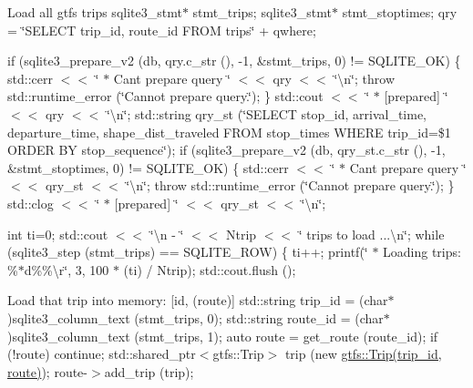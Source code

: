 Load all gtfs {\ttfamily trips} sqlite3\+\_\+stmt$\ast$ stmt\+\_\+trips; sqlite3\+\_\+stmt$\ast$ stmt\+\_\+stoptimes; qry = \char`\"{}\+S\+E\+L\+E\+C\+T trip\+\_\+id, route\+\_\+id F\+R\+O\+M trips\char`\"{} + qwhere;

if (sqlite3\+\_\+prepare\+\_\+v2 (db, qry.\+c\+\_\+str (), -\/1, \&stmt\+\_\+trips, 0) != S\+Q\+L\+I\+T\+E\+\_\+\+OK) \{ std\+::cerr $<$$<$ \char`\"{} $\ast$ Can\textquotesingle{}t prepare query \char`\"{} $<$$<$ qry $<$$<$ \char`\"{}\textbackslash{}n\char`\"{}; throw std\+::runtime\+\_\+error (\char`\"{}\+Cannot prepare query.\char`\"{}); \} std\+::cout $<$$<$ \char`\"{} $\ast$ \mbox{[}prepared\mbox{]} \char`\"{} $<$$<$ qry $<$$<$ \char`\"{}\textbackslash{}n\char`\"{}; std\+::string qry\+\_\+st (\char`\"{}\+S\+E\+L\+E\+C\+T stop\+\_\+id, arrival\+\_\+time, departure\+\_\+time, shape\+\_\+dist\+\_\+traveled F\+R\+O\+M stop\+\_\+times W\+H\+E\+R\+E trip\+\_\+id=\$1 O\+R\+D\+E\+R B\+Y stop\+\_\+sequence\char`\"{}); if (sqlite3\+\_\+prepare\+\_\+v2 (db, qry\+\_\+st.\+c\+\_\+str (), -\/1, \&stmt\+\_\+stoptimes, 0) != S\+Q\+L\+I\+T\+E\+\_\+\+OK) \{ std\+::cerr $<$$<$ \char`\"{} $\ast$ Can\textquotesingle{}t prepare query \char`\"{} $<$$<$ qry\+\_\+st $<$$<$ \char`\"{}\textbackslash{}n\char`\"{}; throw std\+::runtime\+\_\+error (\char`\"{}\+Cannot prepare query.\char`\"{}); \} std\+::clog $<$$<$ \char`\"{} $\ast$ \mbox{[}prepared\mbox{]} \char`\"{} $<$$<$ qry\+\_\+st $<$$<$ \char`\"{}\textbackslash{}n\char`\"{};

int ti=0; std\+::cout $<$$<$ \char`\"{}\textbackslash{}n   -\/ \char`\"{} $<$$<$ Ntrip $<$$<$ \char`\"{} trips to load ...\textbackslash{}n\char`\"{}; while (sqlite3\+\_\+step (stmt\+\_\+trips) == S\+Q\+L\+I\+T\+E\+\_\+\+R\+OW) \{ ti++; printf(\char`\"{} $\ast$ Loading trips\+: \%$\ast$d\%\%\textbackslash{}r\char`\"{}, 3, 100 $\ast$ (ti) / Ntrip); std\+::cout.\+flush ();

Load that trip into memory\+: \mbox{[}id, (route)\mbox{]} std\+::string trip\+\_\+id = (char$\ast$)sqlite3\+\_\+column\+\_\+text (stmt\+\_\+trips, 0); std\+::string route\+\_\+id = (char$\ast$)sqlite3\+\_\+column\+\_\+text (stmt\+\_\+trips, 1); auto route = get\+\_\+route (route\+\_\+id); if (!route) continue; std\+::shared\+\_\+ptr$<$gtfs\+::\+Trip$>$ trip (new \hyperlink{classgtfs_1_1Trip}{gtfs\+::\+Trip(trip\+\_\+id, route)}); route-\/$>$add\+\_\+trip (trip);

